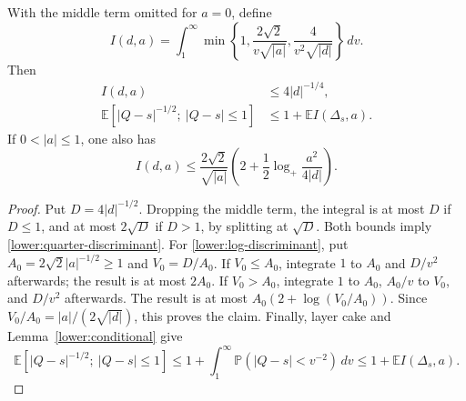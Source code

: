 \begin{lemma}\label{lower:integrated}
With the middle term omitted for $a=0$, define
\[
 I(d,a)=\int_1^\infty
 \min\left\{1,\frac{2\sqrt2}{v\sqrt{|a|}},
                  \frac4{v^2\sqrt{|d|}}\right\}\,dv.
\]
Then
\begin{align}
 I(d,a)&\leq4|d|^{-1/4},\label{lower:quarter-discriminant}\\
 \mathbb E[|Q-s|^{-1/2};\ |Q-s|\leq1]
       &\leq1+\mathbb E I(\Delta_s,a).
       \label{lower:riesz-discriminant}
\end{align}
If $0<|a|\leq1$, one also has
\begin{equation}\label{lower:log-discriminant}
 I(d,a)\leq\frac{2\sqrt2}{\sqrt{|a|}}
       \left(2+\frac12\log_+\frac{a^2}{4|d|}\right).
\end{equation}
\end{lemma}
\begin{proof}
Put $D=4|d|^{-1/2}$.  Dropping the middle term, the integral is at
most $D$ if $D\leq1$, and at most $2\sqrt D$ if $D>1$, by splitting
at $\sqrt D$.  Both bounds imply \eqref{lower:quarter-discriminant}.
For \eqref{lower:log-discriminant}, put
$A_0=2\sqrt2|a|^{-1/2}\geq1$ and $V_0=D/A_0$.
If $V_0\leq A_0$, integrate $1$ to $A_0$ and $D/v^2$ afterwards;
the result is at most $2A_0$.  If $V_0>A_0$, integrate $1$ to
$A_0$, $A_0/v$ to $V_0$, and $D/v^2$ afterwards.  The result is at
most $A_0(2+\log(V_0/A_0))$.
Since $V_0/A_0=|a|/(2\sqrt{|d|})$, this proves the claim.
Finally, layer cake and Lemma~\ref{lower:conditional} give
\[
 \mathbb E[|Q-s|^{-1/2};\ |Q-s|\leq1]
 \leq1+\int_1^\infty\mathbb P(|Q-s|<v^{-2})\,dv
 \leq1+\mathbb E I(\Delta_s,a).
\]
\end{proof}

